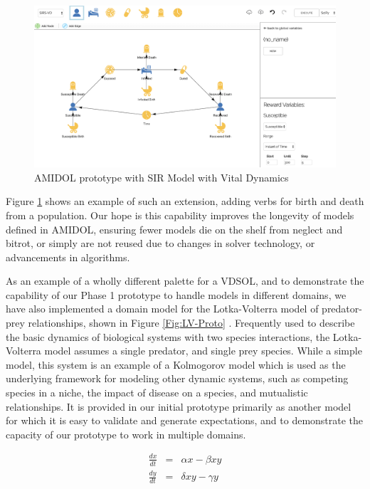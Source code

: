 \documentclass[11pt]{article}
\newcommand{\amidol}{\textsc{AMIDOL}}
\begin{document}
\begin{figure}
\includegraphics[width=\textwidth]{figs/SIR-VD.png}
\caption{\amidol{} prototype with SIR Model with Vital Dynamics}
\label{Fig:SIR-VD-Proto}
\end{figure}

Figure \ref{Fig:SIR-VD-Proto} shows an example of such an extension,
adding verbs for birth and death from a population.  Our hope is this
capability improves the longevity of models defined in \amidol{},
ensuring fewer models die on the shelf from neglect and bitrot, or
simply are not reused due to changes in solver technology, or
advancements in algorithms.

As an example of a wholly different palette for a VDSOL, and to
demonstrate the capability of our Phase 1 prototype to handle models
in different domains, we have also implemented a domain model for the
Lotka-Volterra model of predator-prey relationships, shown in Figure \ref{Fig:LV-Proto}
\cite{freedman1980deterministic,brauer2012mathematical,hoppensteadt2006predator}.
Frequently used to describe the basic dynamics of biological systems
with two species interactions, the Lotka-Volterra model assumes a
single predator, and single prey species.  While a simple model, this
system is an example of a Kolmogorov model which is used as the
underlying framework for modeling other dynamic systems, such as
competing species in a niche, the impact of disease on a species, and
mutualistic relationships.  It is provided in our initial prototype
primarily as another model for which it is easy to validate and
generate expectations, and to demonstrate the capacity of our
prototype to work in multiple domains.

\begin{eqnarray}
  \frac{dx}{dt} &=& \alpha x - \beta x y\\
  \frac{dy}{dt} &=& \delta x y - \gamma y
\end{eqnarray}
\end{document}
